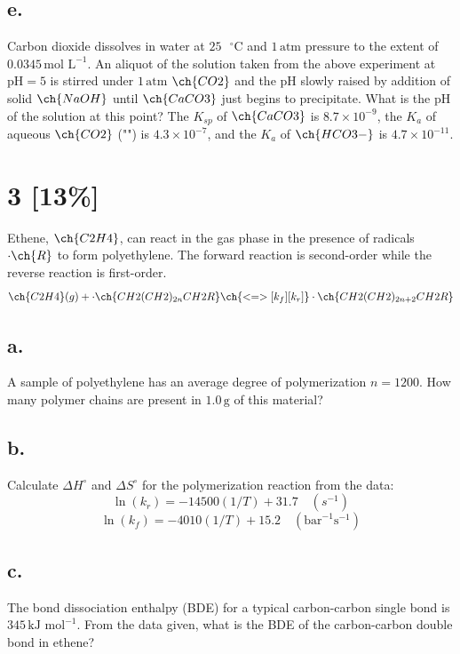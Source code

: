 \documentclass[11pt]{article}
\begin{document}
\subsection*{e.} Carbon dioxide dissolves in water at $25\text{ }^{\circ}\text{C}$ and $1\,\text{atm}$ pressure to the extent of $0.0345\,\text{mol L}^{-1}$. An aliquot of the solution taken from the above experiment at $\text{pH} = 5$ is stirred under $1\,\text{atm}$ $\ch{CO2}$ and the pH slowly raised by addition of solid $\ch{NaOH}$ until $\ch{CaCO3}$ just begins to precipitate. What is the pH of the solution at this point? The $K_{sp}$ of $\ch{CaCO3}$ is $8.7\times10^{-9}$, the $K_a$ of aqueous $\ch{CO2}$ ("") is $4.3\times10^{-7}$, and the $K_a$ of $\ch{HCO3-}$ is $4.7\times10^{-11}$.
\vspace{4cm}

\newpage
\section{3 [13\%]}
Ethene, $\ch{C2H4}$, can react in the gas phase in the presence of radicals $\cdot\ch{R}$ to form polyethylene. The forward reaction is second-order while the reverse reaction is first-order.
$$\ch{C2H4}(g) + \cdot\ch{CH2(CH2)_{2n}CH2R} \ch{<=>[k_f][k_r]} \cdot\ch{CH2(CH2)_{2n+2}CH2R}$$

\subsection*{a.} A sample of polyethylene has an average degree of polymerization $n = 1200$. How many polymer chains are present in $1.0\,\text{g}$ of this material?
\vspace{3cm}

\subsection*{b.} Calculate $\Delta H^{\circ}$ and $\Delta S^{\circ}$ for the polymerization reaction from the data:
$$\ln(k_r) = -14500(1/T) + 31.7 \quad (s^{-1})$$
$$\ln(k_f) = -4010(1/T) + 15.2 \quad (\text{bar}^{-1}\text{s}^{-1})$$
\vspace{4cm}

\subsection*{c.} The bond dissociation enthalpy (BDE) for a typical carbon-carbon single bond is $345\,\text{kJ mol}^{-1}$. From the data given, what is the BDE of the carbon-carbon double bond in ethene?
\vspace{3cm}
\end{document}
